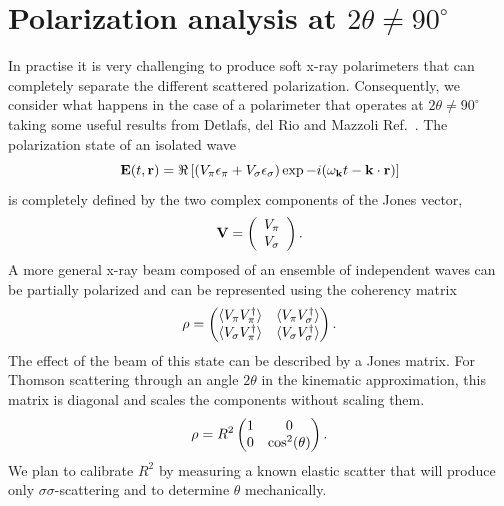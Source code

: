 \documentclass[aps,onecolumn, notitlepage, longbibliography]{revtex4-1}
\begin{document}
\section{Polarization analysis at $2\theta \neq 90^\circ$ }
In practise it is very challenging to produce soft x-ray polarimeters that can completely separate  the different scattered polarization. Consequently, we consider what happens in the case of a polarimeter that operates at $2\theta \neq 90^\circ$ taking some useful results from Detlafs, del Rio and Mazzoli Ref.~\cite{Detlefs2012}. The polarization state of an isolated wave
\begin{equation}
        {\bf E}(t, {\bf r})
        = \Re\left[
                \left(V_{\pi} \epsilon_{\pi} 
                + V_{\sigma} \epsilon_{\sigma}\right)
        \exp{-i(\omega_{\bf k} t - {\bf k}\cdot{\bf r})}
        \right]
        \label{el_field}
\end{equation}
is completely defined by the two complex components of the Jones vector,
\begin{equation}
{\bf V} = \left(\begin{array}{c}V_\pi\\V_\sigma\end{array}\right). \end{equation}
A more general x-ray beam composed of an ensemble of independent waves can be partially polarized and can be represented using the coherency matrix
\begin{equation}
{\bf \rho} = 
  \begin{pmatrix}
    \langle V_{\pi}V_{\pi}^{\dagger} \rangle  & \langle V_{\pi}V_{\sigma}^{\dagger} \rangle \\
    \langle V_{\sigma}V_{\pi}^{\dagger} \rangle &  \langle V_{\sigma}V_{\sigma}^{\dagger} \rangle
  \end{pmatrix} .
\end{equation}
The effect of the beam of this state can be described by a Jones matrix. For Thomson scattering through an angle $2\theta$ in the kinematic approximation, this matrix is diagonal and scales the components without scaling them.
\begin{equation}
{\bf \rho} = R^2
  \begin{pmatrix}
    1  & 0  \\
    0 &  \cos^2(\theta)
  \end{pmatrix} .
\end{equation}
We plan to calibrate $R^2$ by measuring a known elastic scatter that will produce only $\sigma \sigma$-scattering and to determine $\theta$ mechanically. 
\end{document}
